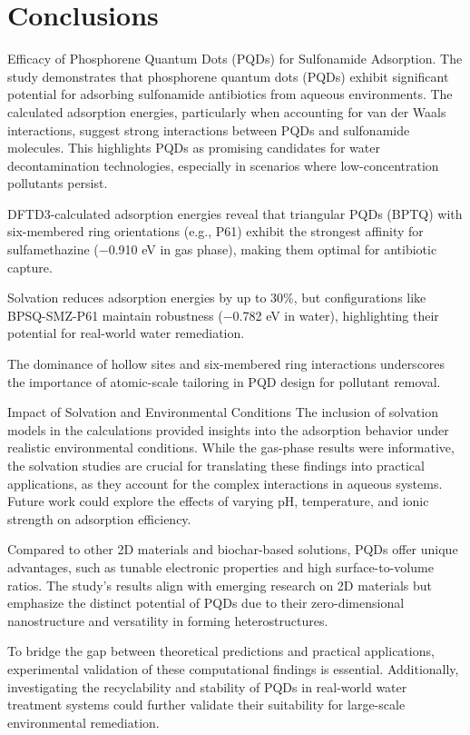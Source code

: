 \documentclass[preprint,12pt]{elsarticle}
\begin{document}
	
	\section{Conclusions}
	
	Efficacy of Phosphorene Quantum Dots (PQDs) for Sulfonamide Adsorption. 
	The study demonstrates that phosphorene quantum dots (PQDs) exhibit significant potential for adsorbing sulfonamide antibiotics from aqueous environments. The calculated adsorption energies, particularly when accounting for van der Waals interactions, suggest strong interactions between PQDs and sulfonamide molecules. This highlights PQDs as promising candidates for water decontamination technologies, especially in scenarios where low-concentration pollutants persist.
	
	DFTD3-calculated adsorption energies reveal that triangular PQDs (BPTQ) with six-membered ring orientations (e.g., P61) exhibit the strongest affinity for sulfamethazine (−0.910 eV in gas phase), making them optimal for antibiotic capture.
	
	Solvation reduces adsorption energies by up to 30\%, but configurations like BPSQ-SMZ-P61 maintain robustness (−0.782 eV in water), highlighting their potential for real-world water remediation.
	
	The dominance of hollow sites and six-membered ring interactions underscores the importance of atomic-scale tailoring in PQD design for pollutant removal.
	
	
	
	Impact of Solvation and Environmental Conditions
	The inclusion of solvation models in the calculations provided insights into the adsorption behavior under realistic environmental conditions. While the gas-phase results were informative, the solvation studies are crucial for translating these findings into practical applications, as they account for the complex interactions in aqueous systems. Future work could explore the effects of varying pH, temperature, and ionic strength on adsorption efficiency.
	
	Compared to other 2D materials and biochar-based solutions, PQDs offer unique advantages, such as tunable electronic properties and high surface-to-volume ratios. The study’s results align with emerging research on 2D materials but emphasize the distinct potential of PQDs due to their zero-dimensional nanostructure and versatility in forming heterostructures.
	
	To bridge the gap between theoretical predictions and practical applications, experimental validation of these computational findings is essential. Additionally, investigating the recyclability and stability of PQDs in real-world water treatment systems could further validate their suitability for large-scale environmental remediation.
	
	\newpage
	
	
	
\end{document}
